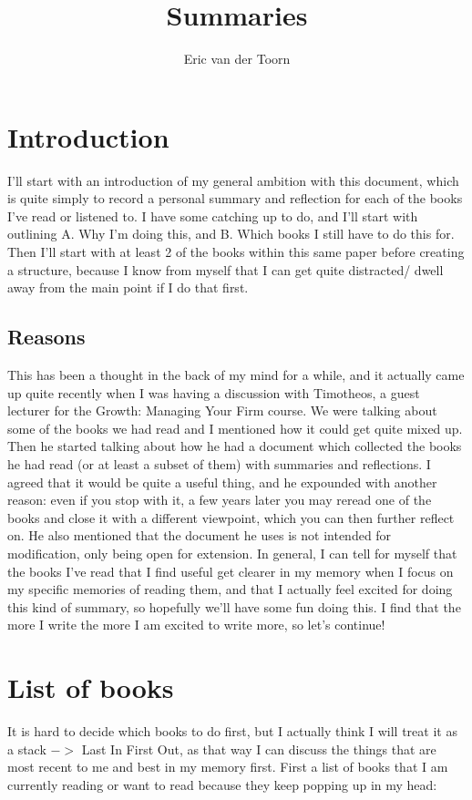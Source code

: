 \documentclass[12pt,a4paper]{article} %
\author{Eric van der Toorn}
\title{Summaries}
\begin{document}
\maketitle
\section{Introduction}
I'll start with an introduction of my general ambition with this document, which is quite simply to record a personal summary and reflection for each of the books I've read or listened to. I have some catching up to do, and I'll start with outlining A. Why I'm doing this, and B. Which books I still have to do this for. Then I'll start with at least 2 of the books within this same paper before creating a structure, because I know from myself that I can get quite distracted/ dwell away from the main point if I do that first.
\subsection{Reasons}
This has been a thought in the back of my mind for a while, and it actually came up quite recently when I was having a discussion with Timotheos, a guest lecturer for the Growth: Managing Your Firm course. We were talking about some of the books we had read and I mentioned how it could get quite mixed up. Then he started talking about how he had a document which collected the books he had read (or at least a subset of them) with summaries and reflections. I agreed that it would be quite a useful thing, and he expounded with another reason: even if you stop with it, a few years later you may reread one of the books and close it with a different viewpoint, which you can then further reflect on. He also mentioned that the document he uses is not intended for modification, only being open for extension.
In general, I can tell for myself that the books I've read that I find useful get clearer in my memory when I focus on my specific memories of reading them, and that I actually feel excited for doing this kind of summary, so hopefully we'll have some fun doing this. I find that the more I write the more I am excited to write more, so let's continue!

\section{List of books}
It is hard to decide which books to do first, but I actually think I will treat it as a stack $->$ Last In First Out, as that way I can discuss the things that are most recent to me and best in my memory first. 
First a list of books that I am currently reading or want to read because they keep popping up in my head:
\end{document}
